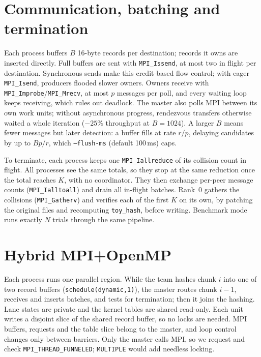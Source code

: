 \documentclass[10pt,a4paper]{article}
\newcommand{\code}[1]{\texttt{#1}}
\begin{document}
\section{Communication, batching and termination}
Each process buffers $B$ 16-byte records per destination; records it owns are inserted directly. Full
buffers are sent with \code{MPI\_Issend}, at most two in flight per destination. Synchronous sends
make this credit-based flow control; with eager \code{MPI\_Isend}, producers flooded slower owners. Owners receive with \code{MPI\_Improbe}/\code{MPI\_Mrecv}, at most
$p$ messages per poll, and every waiting loop keeps receiving, which rules out deadlock. The master
also polls MPI between its own work units; without asynchronous progress, rendezvous transfers
otherwise waited a whole iteration ($-25\%$ throughput at $B{=}1024$). A larger $B$ means
fewer messages but later detection: a buffer fills at rate $r/p$, delaying candidates by up to
$Bp/r$, which \code{--flush-ms} (default 100\,ms) caps.

To terminate, each process keeps one \code{MPI\_Iallreduce} of its collision count in flight. All
processes see the same totals, so they stop at the same reduction once the total reaches $K$, with no
coordinator. They then exchange per-peer message counts (\code{MPI\_Ialltoall}) and drain all
in-flight batches. Rank~0 gathers the collisions (\code{MPI\_Gatherv}) and verifies each of the first
$K$ on its own, by patching the original files and recomputing \code{toy\_hash}, before writing.
Benchmark mode runs exactly $N$ trials through the same pipeline.

\section{Hybrid MPI+OpenMP}
Each process runs one parallel region. While the team hashes chunk $i$ into one of two record
buffers (\code{schedule(dynamic,1)}), the master routes chunk $i{-}1$, receives and inserts batches,
and tests for termination; then it joins the hashing. Lane states are private and the kernel tables
are shared read-only. Each unit writes a disjoint slice of the shared record buffer, so no locks are
needed. MPI buffers, requests and the table slice belong to the master, and loop control changes only
between barriers. Only the master calls MPI, so we request and check \code{MPI\_THREAD\_FUNNELED};
\code{MULTIPLE} would add needless locking.

\begin{table}[t]
\centering\small
\caption{Single-core full-kernel throughput and time to the first verified collision (hybrid; Kaya
4 nodes, $96\times4$; M4 $2\times4$).}
\label{tab:pairs}

\end{table}
\end{document}
